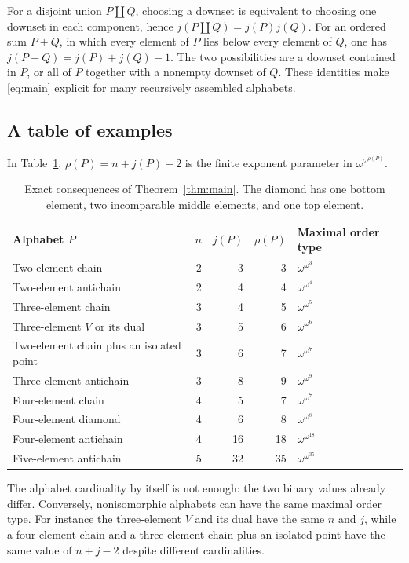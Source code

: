 \documentclass[11pt,a4paper]{article}
\numberwithin{equation}{section}
\theoremstyle{definition}
\theoremstyle{remark}
\begin{document}
For a disjoint union $P\amalg Q$, choosing a downset is equivalent to
choosing one downset in each component, hence
$j(P\amalg Q)=j(P)j(Q)$. For an ordered sum $P+Q$, in which every element
of $P$ lies below every element of $Q$, one has
$j(P+Q)=j(P)+j(Q)-1$. The two possibilities are a downset contained in $P$,
or all of $P$ together with a nonempty downset of $Q$. These identities
make \eqref{eq:main} explicit for many recursively assembled alphabets.

\subsection{A table of examples}
In Table~\ref{tab:examples}, $\rho(P)=n+j(P)-2$ is the finite exponent
parameter in $\omega^{\omega^{\rho(P)}}$.

\begin{table}[htbp]
\centering
\begin{tabular}{@{}lrrrl@{}}
\toprule
Alphabet $P$ & $n$ & $j(P)$ & $\rho(P)$ & Maximal order type\\
\midrule
Two-element chain &2&3&3&$\omega^{\omega^3}$\\
Two-element antichain &2&4&4&$\omega^{\omega^4}$\\
Three-element chain &3&4&5&$\omega^{\omega^5}$\\
Three-element $V$ or its dual &3&5&6&$\omega^{\omega^6}$\\
Two-element chain plus an isolated point &3&6&7&$\omega^{\omega^7}$\\
Three-element antichain &3&8&9&$\omega^{\omega^9}$\\
Four-element chain &4&5&7&$\omega^{\omega^7}$\\
Four-element diamond &4&6&8&$\omega^{\omega^8}$\\
Four-element antichain &4&16&18&$\omega^{\omega^{18}}$\\
Five-element antichain &5&32&35&$\omega^{\omega^{35}}$\\
\bottomrule
\end{tabular}
\caption{Exact consequences of Theorem~\ref{thm:main}. The diamond has one
bottom element, two incomparable middle elements, and one top element.}
\label{tab:examples}
\end{table}

The alphabet cardinality by itself is not enough: the two binary values
already differ. Conversely, nonisomorphic alphabets can have the same
maximal order type. For instance the three-element $V$ and its dual have
the same $n$ and $j$, while a four-element chain and a three-element chain
plus an isolated point have the same value of $n+j-2$ despite different
cardinalities.
\end{document}

